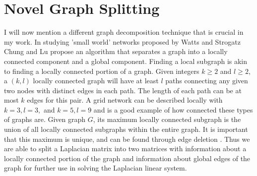 \documentclass{article}
\begin{document}
\section{Novel Graph Splitting}
I will now mention a different graph decomposition technique that is crucial in my work. In studying 'small world' networks proposed by Watts and Strogatz \cite{Watts:1998} Chung and Lu propose an algorithm that separates a graph into a locally connected component and a global component. Finding a local subgraph is akin to finding a locally connected portion of a graph. Given integers $k \geq 2$ and $l \geq 2$, a $(k,l)$ locally connected graph will have at least $l$ paths connecting any given two nodes with distinct edges in each path. The length of each path can be at most $k$ edges for this pair. A grid network can be described locally with $k=3, l=3,$ and $k=5, l=9$ and is a good example of how connected these types of graphs are. Given graph $G$, its maximum locally connected subgraph is the union of all locally connected subgraphs within the entire graph. It is important that this maximum is unique, and can be found through edge deletion \cite{Chung:2004}. Thus we are able to split a Laplacian matrix into two matrices with information about a locally connected portion of the graph and information about global edges of the graph for further use in solving the Laplacian linear system.





\end{document}
